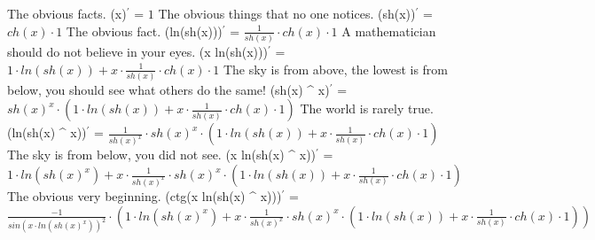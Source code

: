 \documentclass{article}
\begin{document}
{\large The obvious facts. 
\newline\newline
(x)$^{'}$ = $1$} \newline\newline
{\large The obvious things that no one notices. 
\newline\newline
(sh(x))$^{'}$ = $ch(x) \cdot 1$} \newline\newline
{\large The obvious fact. 
\newline\newline
(ln(sh(x)))$^{'}$ = $\frac{1}{sh(x)} \cdot ch(x) \cdot 1$} \newline\newline
{\large A mathematician should do not believe in your eyes. 
\newline\newline
(x \cdot ln(sh(x)))$^{'}$ = $1 \cdot ln(sh(x)) + x \cdot \frac{1}{sh(x)} \cdot ch(x) \cdot 1$} \newline\newline
{\large The sky is from above, the lowest is from below, you should see what others do the same! 
\newline\newline
(sh(x) ^ {x})$^{'}$ = $sh(x) ^ {x} \cdot (1 \cdot ln(sh(x)) + x \cdot \frac{1}{sh(x)} \cdot ch(x) \cdot 1)$} \newline\newline
{\large The world is rarely true. 
\newline\newline
(ln(sh(x) ^ {x}))$^{'}$ = $\frac{1}{sh(x) ^ {x}} \cdot sh(x) ^ {x} \cdot (1 \cdot ln(sh(x)) + x \cdot \frac{1}{sh(x)} \cdot ch(x) \cdot 1)$} \newline\newline
{\large The sky is from below, you did not see. 
\newline\newline
(x \cdot ln(sh(x) ^ {x}))$^{'}$ = $1 \cdot ln(sh(x) ^ {x}) + x \cdot \frac{1}{sh(x) ^ {x}} \cdot sh(x) ^ {x} \cdot (1 \cdot ln(sh(x)) + x \cdot \frac{1}{sh(x)} \cdot ch(x) \cdot 1)$} \newline\newline
{\large The obvious very beginning. 
\newline\newline
(ctg(x \cdot ln(sh(x) ^ {x})))$^{'}$ = $\frac{-1}{sin(x \cdot ln(sh(x) ^ {x})) ^ {2}} \cdot (1 \cdot ln(sh(x) ^ {x}) + x \cdot \frac{1}{sh(x) ^ {x}} \cdot sh(x) ^ {x} \cdot (1 \cdot ln(sh(x)) + x \cdot \frac{1}{sh(x)} \cdot ch(x) \cdot 1))$} \newline\newline
\end{document}
